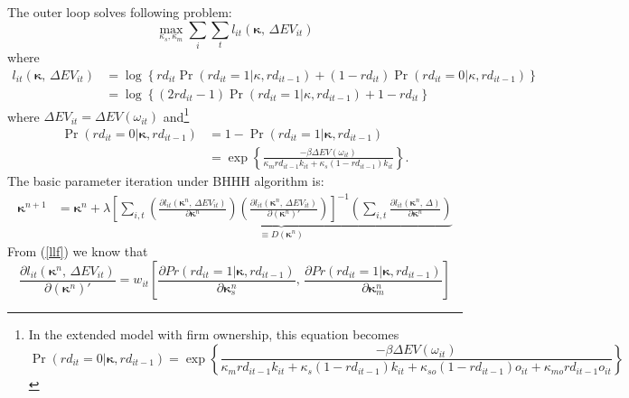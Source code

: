 \documentclass[11pt]{article}
\begin{document}
The outer loop solves following problem:
\[
\max_{\kappa_{s},\kappa_{m}}\sum_{i}\sum_{t}l_{it}\left(\boldsymbol{\kappa},\,\Delta EV_{it}\right)
\]
 where 
\begin{align}
l_{it}\left(\boldsymbol{\kappa},\,\Delta EV_{it}\right) & =\log\left\{ rd_{it}\Pr\left(rd_{it}=1|\kappa,rd_{it-1}\right)+\left(1-rd_{it}\right)\Pr\left(rd_{it}=0|\kappa,rd_{it-1}\right)\right\} \label{llf}\\
 & =\log\left\{ \left(2rd_{it}-1\right)\Pr\left(rd_{it}=1|\kappa,rd_{it-1}\right)+1-rd_{it}\right\} \nonumber 
\end{align}
where $\Delta EV_{it}=\Delta EV\left(\omega_{it}\right)$ and\footnote{In the extended model with firm ownership, this equation becomes
\begin{equation*}
    \Pr\left(rd_{it}=0|\boldsymbol{\kappa},rd_{it-1}\right) = \exp\left\{ \frac{-\beta\Delta EV\left(\omega_{it}\right)}{\kappa_{m}rd_{it-1}k_{it}+\kappa_{s}\left(1-rd_{it-1}\right)k_{it}+\kappa_{so}\left(1-rd_{it-1}\right)o_{it}+\kappa_{mo}rd_{it-1}o_{it}}\right\}
\end{equation*}} 
\begin{align}
\Pr\left(rd_{it}=0|\boldsymbol{\kappa},rd_{it-1}\right) & =1-\Pr\left(rd_{it}=1|\boldsymbol{\kappa},rd_{it-1}\right)\\
 & =\exp\left\{ \frac{-\beta\Delta EV\left(\omega_{it}\right)}{\kappa_{m}rd_{it-1}k_{it}+\kappa_{s}\left(1-rd_{it-1}\right)k_{it}}\right\}. \nonumber 
\end{align}
The basic parameter iteration under BHHH algorithm is:
\begin{align*}
\boldsymbol{\kappa}^{n+1} & =\boldsymbol{\kappa}^{n}+\lambda\underset{\equiv D\left(\boldsymbol{\kappa}^{n}\right)}{\underbrace{\left[\sum_{i,t}\left(\frac{\partial l_{it}\left(\boldsymbol{\kappa}^{n},\,\Delta EV_{it}\right)}{\partial\boldsymbol{\kappa}^{n}}\right)\left(\frac{\partial l_{it}\left(\boldsymbol{\kappa}^{n},\,\Delta EV_{it}\right)}{\partial(\boldsymbol{\kappa}^{n})'}\right)\right]^{-1}\left(\sum_{i,t}\frac{\partial l_{it}\left(\boldsymbol{\kappa}^{n},\,\Delta\right)}{\partial\boldsymbol{\kappa}^{n}}\right)}}
\end{align*}
From (\ref{llf}) we know that 
\begin{equation}
\frac{\partial l_{it}\left(\boldsymbol{\kappa}^{n},\,\Delta EV_{it}\right)}{\partial(\boldsymbol{\kappa}^{n})'}=w_{it}\left[\frac{\partial Pr\left(rd_{it}=1|\boldsymbol{\kappa},rd_{it-1}\right)}{\partial\boldsymbol{\kappa}_{s}^{n}},\,\frac{\partial Pr\left(rd_{it}=1|\boldsymbol{\kappa},rd_{it-1}\right)}{\partial\boldsymbol{\kappa}_{m}^{n}}\right]
\end{equation}
\end{document}
